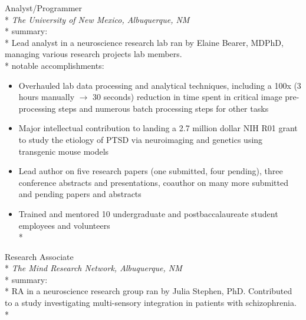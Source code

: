 \documentclass[]{friggeri-cv} %
\begin{document}
\begin{description}
  \item {\largeheaderfont Analyst/Programmer} \hfill 
    { }\\*
    {\footnotesize \emph{The University of New Mexico, Albuquerque, NM }} \\*
    {\smallheaderfont summary}: \\*
    Lead analyst in a neuroscience research lab ran by Elaine Bearer,
    MD\textemdash PhD, managing various research projects lab members. \\*
    {\smallheaderfont notable accomplishments}:
    \begin{itemize} \itemsep1pt \parskip0pt 
      \item Overhauled lab data processing and analytical techniques, including
        a 100x (3 hours manually $\rightarrow$ 30 seconds) reduction in time
        spent in critical image pre-processing steps and numerous batch
        processing steps for other tasks
      \item Major intellectual contribution to landing a 2.7 million dollar NIH
        R01 grant to study the etiology of PTSD via neuroimaging and genetics
        using transgenic mouse models
      \item Lead author on five research papers (one submitted, four pending),
        three conference abstracts and presentations, coauthor on many more
        submitted and pending papers and abstracts
      \item Trained and mentored 10 undergraduate and postbaccalaureate student
        employees and volunteers\\*
    \end{itemize}
  \item  {\largeheaderfont Research Associate} \hfill {} \\*
    {\footnotesize \emph{The Mind Research Network, Albuquerque, NM}}  \\*
    {\smallheaderfont summary:} \\*
    RA in a neuroscience research group ran by Julia Stephen, PhD. Contributed
    to a study investigating multi-sensory integration in patients with
    schizophrenia. \\*
\end{description}
\end{document}
